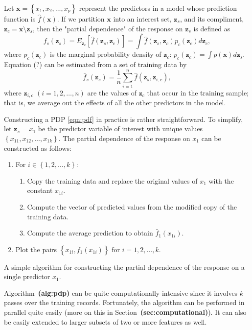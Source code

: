 \documentclass[12pt]{article}
\def\ref#1{\textbf{(#1)}}
\begin{document}
Let $\boldsymbol{x} = \left\{x_1, x_2, \dots, x_p\right\}$ represent the predictors in a model whose prediction function is $\widehat{f}\left(\boldsymbol{x}\right)$. If we partition $\boldsymbol{x}$ into an interest set, $\boldsymbol{z}_s$, and its compliment, $\boldsymbol{z}_c = \boldsymbol{x} \setminus \boldsymbol{z}_s$, then the "partial dependence" of the response on $\boldsymbol{z}_s$ is defined as
\begin{equation}
\label{eqn:avg_fun}
  f_s\left(\boldsymbol{z}_s\right) = E_{\boldsymbol{z}_c}\left[\widehat{f}\left(\boldsymbol{z}_s, \boldsymbol{z}_c\right)\right] = \int \widehat{f}\left(\boldsymbol{z}_s, \boldsymbol{z}_c\right)p_{c}\left(\boldsymbol{z}_c\right)d\boldsymbol{z}_c,
\end{equation}
where $p_{c}\left(\boldsymbol{z}_c\right)$ is the marginal probability density of $\boldsymbol{z}_c$: $p_{c}\left(\boldsymbol{z}_c\right) = \int p\left(\boldsymbol{x}\right)d\boldsymbol{z}_s$.
Equation (?) can be estimated from a set of training data by
\begin{equation}
\label{eqn:pdf}
\bar{f}_s\left(\boldsymbol{z}_s\right) = \frac{1}{n}\sum_{i = 1}^n\widehat{f}\left(\boldsymbol{z}_s,\boldsymbol{z}_{i, c}\right),
\end{equation}
where $\boldsymbol{z}_{i, c}$ $\left(i = 1, 2, \dots, n\right)$ are the values of $\boldsymbol{z}_c$ that occur in the training sample; that is, we average out the effects of all the other predictors in the model.

Constructing a PDP \eqref{eqn:pdf} in practice is rather straightforward. To simplify, let $\boldsymbol{z}_s = x_1$ be the predictor variable of interest with unique values $\left\{x_{11}, x_{12}, \dots, x_{1k}\right\}$. The partial dependence of the response on $x_1$ can be constructed as follows:

\begin{algorithm}
\begin{enumerate}
  \item For $i \in \left\{1, 2, \dots, k\right\}$:
  \begin{enumerate}
    \item Copy the training data and replace the original values of $x_1$ with the constant $x_{1i}$.
    \item Compute the vector of predicted values from the modified copy of the training data.
    \item Compute the average prediction to obtain $\bar{f}_1\left(x_{1i}\right)$.
  \end{enumerate}
  \item Plot the pairs $\left\{x_{1i}, \bar{f}_1\left(x_{1i}\right)\right\}$ for $i = 1, 2, \dotsc, k$.
\end{enumerate}
\caption{A simple algorithm for constructing the partial dependence of the response on a single predictor $x_1$. \label{alg:pdp}}
\end{algorithm}
Algorithm~\ref{alg:pdp} can be quite computationally intensive since it involves $k$ passes over the training records. Fortunately, the algorithm can be performed in parallel quite easily (more on this in Section~\ref{sec:computational}). It can also be easily extended to larger subsets of two or more features as well.
\end{document}
